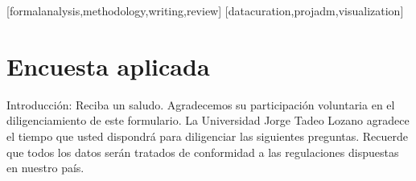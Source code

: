 \documentclass[spanish]{textolivre}
\begin{document}
\printbibliography\label{sec-bib}


\begin{contributors}
[formalanalysis,methodology,writing,review]
[datacuration,projadm,visualization]
\end{contributors}

\appendix 
\section*{Encuesta aplicada}\label{apen}
Introducción: Reciba un saludo. Agradecemos su participación voluntaria en el diligenciamiento de este formulario. La Universidad Jorge Tadeo Lozano agradece el tiempo que usted dispondrá para diligenciar las siguientes preguntas. Recuerde que todos los datos serán tratados de conformidad a las regulaciones dispuestas en nuestro país.
\end{document}
